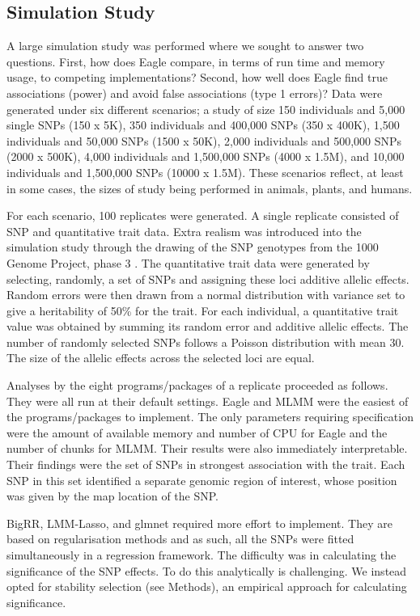 \documentclass{nature}
\begin{document}
\subsection{Simulation Study}
A large simulation study was performed where we sought to  answer two questions. 
First, how does Eagle compare, in terms of run time and memory usage, to 
competing implementations? Second, how well does Eagle find true associations (power) and avoid 
false associations (type 1 errors)? Data were generated under six different scenarios; a study of size 150 individuals 
and 5,000 single SNPs (150 x 5K),  350 individuals and 400,000 SNPs (350 x 400K),  1,500 individuals and 
50,000 SNPs (1500 x 50K), 2,000 individuals and 500,000 SNPs (2000 x 500K), 4,000 individuals and 
1,500,000 SNPs (4000 x 1.5M), and 10,000 individuals and 1,500,000 SNPs (10000 x 1.5M).   
These scenarios reflect, at least in some cases, the sizes of study being performed in animals, plants, and humans.  

For each scenario, 100 replicates were generated. A single replicate consisted of SNP and quantitative trait data. 
Extra realism was introduced into the simulation study through the drawing of the SNP genotypes from the 1000 Genome Project, phase 3  \cite{10002010map}.
 The quantitative trait data were generated 
by selecting, randomly, a set of SNPs and assigning these loci additive allelic effects.  Random errors were then drawn from a normal distribution 
with variance set to give a heritability of 50\% for the trait. 
For each individual, a quantitative trait value was obtained by summing its random error and additive allelic effects. 
The number of randomly selected SNPs follows a Poisson distribution with mean 30. The size of the allelic effects 
 across the selected loci are equal.  
 
 Analyses by the eight programs/packages of a replicate proceeded as follows. They were all run at their default settings. 
 Eagle and MLMM were the easiest of the programs/packages to implement. 
 The only parameters requiring specification were the amount of available memory and number of CPU for 
 Eagle and the number of chunks for MLMM. 
 Their results were also immediately 
 interpretable. Their findings were the set of SNPs in strongest association with the trait. Each 
SNP in this set identified a separate genomic region of interest, whose position was given by the map location of the SNP.  

BigRR, LMM-Lasso, and glmnet required more effort to implement. They are based on regularisation methods and as such, all the SNPs were fitted simultaneously in a regression 
framework. The difficulty was in calculating the significance of the SNP effects. To do this analytically is challenging. We instead opted for stability selection (see Methods),  
an empirical approach for calculating significance. 
\end{document}
